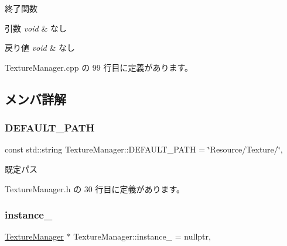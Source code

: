 終了関数 


\begin{DoxyParams}{引数}
{\em void} & なし \\
\hline
\end{DoxyParams}

\begin{DoxyRetVals}{戻り値}
{\em void} & なし \\
\hline
\end{DoxyRetVals}


 Texture\+Manager.\+cpp の 99 行目に定義があります。



\subsection{メンバ詳解}
\mbox{\label{class_texture_manager_a7cdcbb47cf36d179ae88716210e7db65}} 
\subsubsection{\texorpdfstring{D\+E\+F\+A\+U\+L\+T\+\_\+\+P\+A\+TH}{DEFAULT\_PATH}}
{\footnotesize\ttfamily const std\+::string Texture\+Manager\+::\+D\+E\+F\+A\+U\+L\+T\+\_\+\+P\+A\+TH = \char`\"{}Resource/Texture/\char`\"{}\hspace{0.3cm}{\ttfamily [static]}, {\ttfamily [private]}}



既定パス 



 Texture\+Manager.\+h の 30 行目に定義があります。

\mbox{\label{class_texture_manager_ac52b2d7e39fd06b9571658025ae609a4}} 
\subsubsection{\texorpdfstring{instance\+\_\+}{instance\_}}
{\footnotesize\ttfamily \mbox{\hyperlink{class_texture_manager}{Texture\+Manager}} $\ast$ Texture\+Manager\+::instance\+\_\+ = nullptr\hspace{0.3cm}{\ttfamily [static]}, {\ttfamily [private]}}




